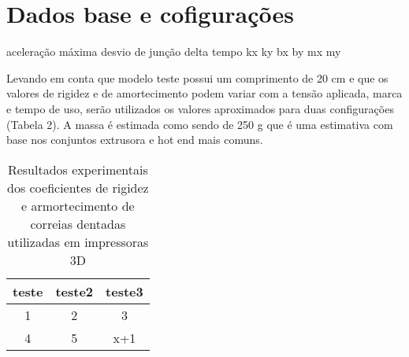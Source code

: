\section{Dados base e cofigurações}

aceleração máxima
desvio de junção
delta tempo
kx
ky
bx
by
mx
my

Levando em conta que modelo teste possui um comprimento de 20 cm e que os valores de rigidez e de amortecimento podem variar com a tensão aplicada, marca e tempo de uso, serão utilizados os valores aproximados para duas configurações (Tabela 2). A massa é estimada como sendo de 250 g que é uma estimativa com base nos conjuntos extrusora e hot end mais comuns.

\begin{table}
    \begin{center}
    \caption{Resultados experimentais dos coeficientes de rigidez e armortecimento de correias dentadas utilizadas em impressoras 3D}
    \label{tab:parametros_expe_belt}
    \begin{tabular}{c c c}
        teste & teste2 & teste3 \\ \hline
        1 & 2 & 3 \\
        4 & 5 & x+1 \\ \hline
    \end{tabular}
    \end{center}
\end{table}
